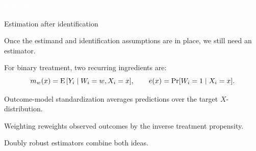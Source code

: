 \documentclass[xcolor={dvipsnames}, handout]{beamer}
\begin{document}


\begin{transitionframe}
\centering

\LARGE \textcolor{white}{Estimation.}

\end{transitionframe}

\begin{frame}{Estimation after identification}

\begin{wideitemize}
\item Once the estimand and identification assumptions are in place, we still need an estimator. \pause
\item For binary treatment, two recurring ingredients are:
\[
m_w(x)={\textrm E}\,[Y_i \mid W_i=w, X_i=x], \qquad
e(x)=\Pr[W_i=1 \mid X_i=x].
\] \pause
\item Outcome-model standardization averages predictions over the target \(X\)-distribution. \pause
\item Weighting reweights observed outcomes by the inverse treatment propensity. \pause
\item Doubly robust estimators combine both ideas.
\end{wideitemize}

\end{frame}


\end{document}
